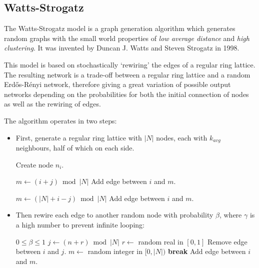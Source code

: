 \documentclass[a4paper,11pt,titlepage]{article}
\begin{document}
\subsection{Watts-Strogatz}
The Watts-Strogatz model is a graph generation algorithm which
generates random graphs with the small world properties of
\emph{low average distance} and \emph{high clustering}.
It was invented by Duncan J. Watts and Steven Strogatz in 1998.

This model is based on stochastically `rewiring' the edges of a
regular ring lattice. The resulting network is a trade-off
between a regular ring lattice and a random Erd\H{o}s-R\'{e}nyi
network, therefore giving a great variation of possible output
networks depending on the probabilities for both the initial
connection of nodes as well as the rewiring of edges.

The algorithm operates in two steps:

\begin{itemize}
  \item First, generate a regular ring lattice with $|N|$ nodes,
        each with $k_{avg}$ neighbours, half of which on each side.

  \begin{algorithmic}
      \STATE Create node $n_i$.
    \ENDFOR

        \STATE $m \gets (i + j) \bmod{|N|}$
        \STATE Add edge between $i$ and $m$.
      \ENDFOR

        \STATE $m \gets (|N| + i - j) \bmod{|N|}$
        \STATE Add edge between $i$ and $m$.
      \ENDFOR
    \ENDFOR
  \end{algorithmic}

  \item Then rewire each edge to another random node with
        probability $\beta$, where $\gamma$ is a high number
        to prevent infinite looping:


  \begin{algorithmic}
    \REQUIRE $0 \leq \beta \leq 1$
        \STATE $j \gets (n + r) \bmod{|N|}$
        \STATE $r \gets$ random real in $[0, 1]$
          \STATE Remove edge between $i$ and $j$.
            \STATE $m \gets$ random integer in $[0, |N|)$
              \STATE \textbf{break}
            \ELSE
              \STATE Add edge between $i$ and $m$.
            \ENDIF
          \ENDFOR
        \ENDIF
      \ENDFOR
    \ENDFOR
  \end{algorithmic}
\end{itemize}
\end{document}

